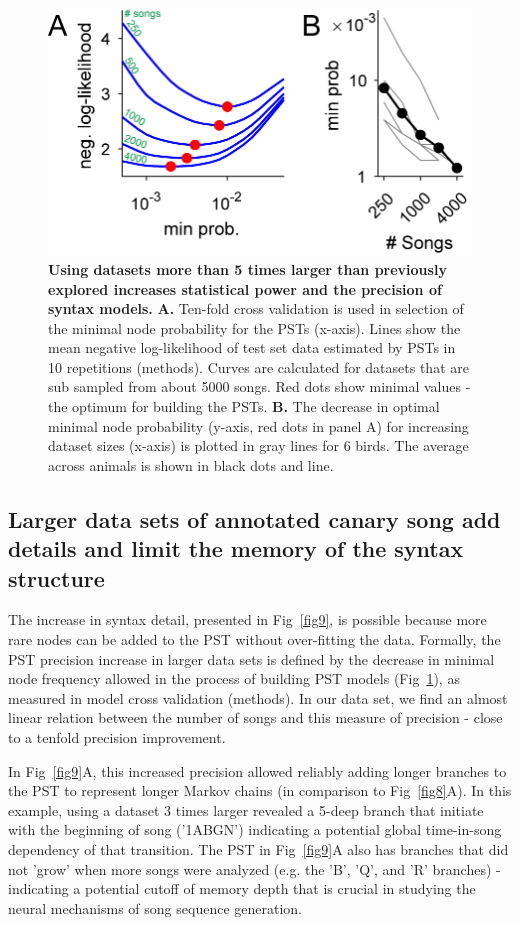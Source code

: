 \documentclass[10pt,letterpaper]{article}
\begin{document}
\begin{figure}[!ht]
\includegraphics[scale=1.0]{Figures/fig10/Figure10_v1.png}
\caption{{\bf Using datasets more than 5 times larger than previously explored increases statistical power and the precision of syntax models.}
\textbf{A.} Ten-fold cross validation is used in selection of the minimal node probability for the PSTs (x-axis). Lines show the mean negative log-likelihood of test set data estimated by PSTs in 10 repetitions (methods). Curves are calculated for datasets that are sub sampled from about 5000 songs. Red dots show minimal values - the optimum for building the PSTs.
\textbf{B.} The decrease in optimal minimal node probability (y-axis, red dots in panel A) for increasing dataset sizes (x-axis) is plotted in gray lines for 6 birds. The average across animals is shown in black dots and line.}
\label{fig10}
\end{figure}

\subsection*{Larger data sets of annotated canary song add details and limit the memory of the syntax structure}
The increase in syntax detail, presented in Fig~\ref{fig9}, is possible because more rare nodes can be added to the PST without over-fitting the data. Formally, the PST precision increase in larger data sets is defined by the decrease in minimal node frequency allowed in the process of building PST models (Fig~\ref{fig10}), as measured in model cross validation (methods). In our data set, we find an almost linear relation between the number of songs and this measure of precision - close to a tenfold precision improvement.

In Fig~\ref{fig9}A, this increased precision allowed reliably adding longer branches to the PST to represent longer Markov chains (in comparison to Fig~\ref{fig8}A). In this example, using a dataset 3 times larger revealed a 5-deep branch that initiate with the beginning of song ('1ABGN') indicating a potential global time-in-song dependency of that transition. The PST in Fig~\ref{fig9}A also has branches that did not 'grow' when more songs were analyzed (e.g. the 'B', 'Q', and 'R' branches) - indicating a potential cutoff of memory depth that is crucial in studying the neural mechanisms of song sequence generation. 
\end{document}
